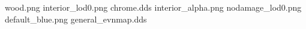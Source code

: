 wood.png
interior_lod0.png
chrome.dds
interior_alpha.png
nodamage_lod0.png
default_blue.png
general_evnmap.dds

